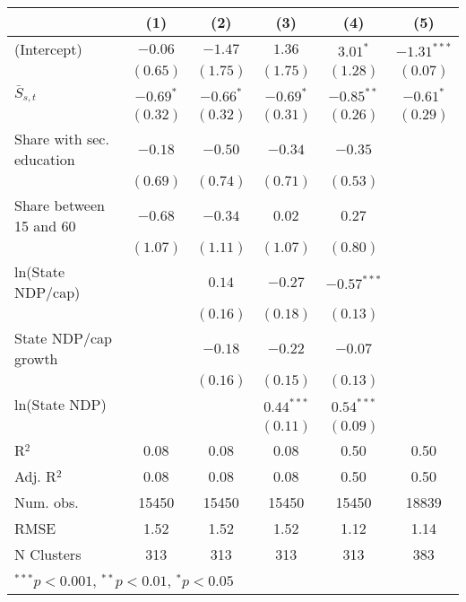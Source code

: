
\begin{tabular}{l c c c c c }
\toprule
 & (1) & (2) & (3) & (4) & (5) \\
\midrule
(Intercept)               & $-0.06$     & $-1.47$     & $1.36$       & $3.01^{*}$    & $-1.31^{***}$ \\
                          & $(0.65)$    & $(1.75)$    & $(1.75)$     & $(1.28)$      & $(0.07)$      \\
$\bar{S}_{s,t}$           & $-0.69^{*}$ & $-0.66^{*}$ & $-0.69^{*}$  & $-0.85^{**}$  & $-0.61^{*}$   \\
                          & $(0.32)$    & $(0.32)$    & $(0.31)$     & $(0.26)$      & $(0.29)$      \\
Share with sec. education & $-0.18$     & $-0.50$     & $-0.34$      & $-0.35$       &               \\
                          & $(0.69)$    & $(0.74)$    & $(0.71)$     & $(0.53)$      &               \\
Share between 15 and 60   & $-0.68$     & $-0.34$     & $0.02$       & $0.27$        &               \\
                          & $(1.07)$    & $(1.11)$    & $(1.07)$     & $(0.80)$      &               \\
ln(State NDP/cap)         &             & $0.14$      & $-0.27$      & $-0.57^{***}$ &               \\
                          &             & $(0.16)$    & $(0.18)$     & $(0.13)$      &               \\
State NDP/cap growth      &             & $-0.18$     & $-0.22$      & $-0.07$       &               \\
                          &             & $(0.16)$    & $(0.15)$     & $(0.13)$      &               \\
ln(State NDP)             &             &             & $0.44^{***}$ & $0.54^{***}$  &               \\
                          &             &             & $(0.11)$     & $(0.09)$      &               \\
\midrule
R$^2$                     & 0.08        & 0.08        & 0.08         & 0.50          & 0.50          \\
Adj. R$^2$                & 0.08        & 0.08        & 0.08         & 0.50          & 0.50          \\
Num. obs.                 & 15450       & 15450       & 15450        & 15450         & 18839         \\
RMSE                      & 1.52        & 1.52        & 1.52         & 1.12          & 1.14          \\
N Clusters                & 313         & 313         & 313          & 313           & 383           \\
\bottomrule
\multicolumn{6}{l}{\tiny{$^{***}p<0.001$, $^{**}p<0.01$, $^*p<0.05$}}
\end{tabular}
